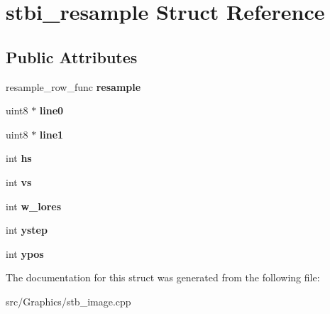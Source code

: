 \hypertarget{structstbi__resample}{\section{stbi\+\_\+resample Struct Reference}
\label{structstbi__resample}
}
\subsection*{Public Attributes}
\begin{DoxyCompactItemize}
\item 
\hypertarget{structstbi__resample_a94091463ebc5933cdaf7a813025b6e19}{resample\+\_\+row\+\_\+func {\bfseries resample}}\label{structstbi__resample_a94091463ebc5933cdaf7a813025b6e19}

\item 
\hypertarget{structstbi__resample_a30c51395efffb663b183d7c64def6db3}{uint8 $\ast$ {\bfseries line0}}\label{structstbi__resample_a30c51395efffb663b183d7c64def6db3}

\item 
\hypertarget{structstbi__resample_ac1165a6da3cf652b951056667f89b1f2}{uint8 $\ast$ {\bfseries line1}}\label{structstbi__resample_ac1165a6da3cf652b951056667f89b1f2}

\item 
\hypertarget{structstbi__resample_a1513390ba0102364169a52ff26d5e0f2}{int {\bfseries hs}}\label{structstbi__resample_a1513390ba0102364169a52ff26d5e0f2}

\item 
\hypertarget{structstbi__resample_a331c717f53239339c0c678f92a7bf4d5}{int {\bfseries vs}}\label{structstbi__resample_a331c717f53239339c0c678f92a7bf4d5}

\item 
\hypertarget{structstbi__resample_a41d43c7b0d6caafbf0dfa8ef064bd2a2}{int {\bfseries w\+\_\+lores}}\label{structstbi__resample_a41d43c7b0d6caafbf0dfa8ef064bd2a2}

\item 
\hypertarget{structstbi__resample_a0c479143447d103e73348c89f8b4ef1c}{int {\bfseries ystep}}\label{structstbi__resample_a0c479143447d103e73348c89f8b4ef1c}

\item 
\hypertarget{structstbi__resample_aa1f1ad33e739f7a38fbad8752f64f983}{int {\bfseries ypos}}\label{structstbi__resample_aa1f1ad33e739f7a38fbad8752f64f983}

\end{DoxyCompactItemize}


The documentation for this struct was generated from the following file\+:\begin{DoxyCompactItemize}
\item 
src/\+Graphics/stb\+\_\+image.\+cpp\end{DoxyCompactItemize}
